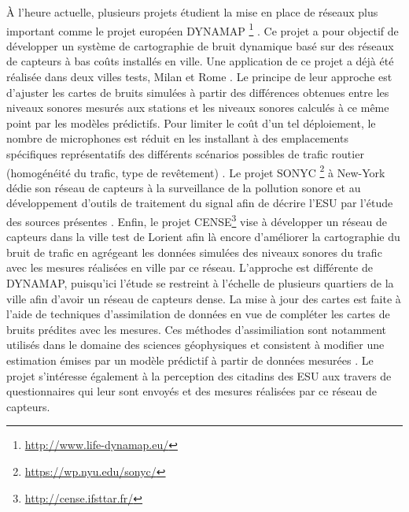 \`A l'heure actuelle, plusieurs projets étudient la mise en place de réseaux plus important comme le projet européen DYNAMAP \footnote{\url{http://www.life-dynamap.eu/}} \cite{dynamap_2016}. Ce projet a pour objectif de développer un système de cartographie de bruit dynamique basé sur des réseaux de capteurs à bas coûts installés en ville. Une application de ce projet a déjà été réalisée dans deux villes tests, Milan et Rome \cite{bellucci_life_2017}.
Le principe de leur approche est d'ajuster les cartes de bruits simulées à partir des différences obtenues entre les niveaux sonores mesurés aux stations et les niveaux sonores calculés à ce même point par les modèles prédictifs. Pour limiter le coût d'un tel déploiement, le nombre de microphones est réduit en les installant à des emplacements spécifiques représentatifs des différents scénarios possibles de trafic routier (homogénéité du trafic, type de revêtement) \cite{zambon2017life}.
Le projet SONYC \footnote{\url{https://wp.nyu.edu/sonyc/}} à New-York dédie son réseau de capteurs à la surveillance de la pollution sonore et au développement d'outils de traitement du signal afin de décrire l'ESU par l'étude des sources présentes \cite{mydlarz2017noise}. 
Enfin, le projet CENSE\footnote{\url{http://cense.ifsttar.fr/}} vise à développer un réseau de capteurs dans la ville test de Lorient afin là encore d'améliorer la cartographie du bruit de trafic en agrégeant les données simulées des niveaux sonores du trafic avec les mesures réalisées en ville par ce réseau. L'approche est différente de DYNAMAP, puisqu'ici l'étude se restreint à l'échelle de plusieurs quartiers de la ville afin d'avoir un réseau de capteurs dense. La mise à jour des cartes est faite à l'aide de techniques d'assimilation de données en vue de compléter les cartes de bruits prédites avec les mesures.
Ces méthodes d'assimiliation sont notamment utilisés dans le domaine des sciences géophysiques et consistent à modifier une estimation émises par un modèle prédictif à partir de données mesurées \cite{wu2008comparison}.
Le projet s'intéresse également à la perception des citadins des ESU aux travers de questionnaires qui leur sont envoyés et des mesures réalisées par ce réseau de capteurs.

